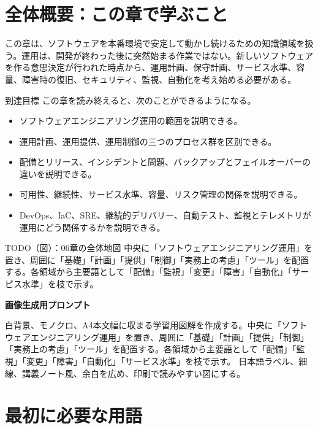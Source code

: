 \documentclass[uplatex,dvipdfmx,a4paper,10pt]{jsarticle}
\newcommand{\todoprompt}[2]{%
\begin{notebox}{TODO（図）：#1}
#2

\textbf{画像生成用プロンプト}

白背景、モノクロ、A4本文幅に収まる学習用図解を作成する。#2 日本語ラベル、細線、講義ノート風、余白を広め、印刷で読みやすい図にする。
\end{notebox}
}
\begin{document}
\tableofcontents
\newpage

\section*{全体概要：この章で学ぶこと}

この章は、ソフトウェアを本番環境で安定して動かし続けるための知識領域を扱う。運用は、開発が終わった後に突然始まる作業ではない。新しいソフトウェアを作る意思決定が行われた時点から、運用計画、保守計画、サービス水準、容量、障害時の復旧、セキュリティ、監視、自動化を考え始める必要がある。

\begin{pointbox}{到達目標}
この章を読み終えると、次のことができるようになる。
\begin{itemize}
  \item ソフトウェアエンジニアリング運用の範囲を説明できる。
  \item 運用計画、運用提供、運用制御の三つのプロセス群を区別できる。
  \item 配備とリリース、インシデントと問題、バックアップとフェイルオーバーの違いを説明できる。
  \item 可用性、継続性、サービス水準、容量、リスク管理の関係を説明できる。
  \item DevOps、IaC、SRE、継続的デリバリー、自動テスト、監視とテレメトリが運用にどう関係するかを説明できる。
\end{itemize}
\end{pointbox}

\todoprompt{06章の全体地図}{中央に「ソフトウェアエンジニアリング運用」を置き、周囲に「基礎」「計画」「提供」「制御」「実務上の考慮」「ツール」を配置する。各領域から主要語として「配備」「監視」「変更」「障害」「自動化」「サービス水準」を枝で示す。}

\section*{最初に必要な用語}
\end{document}
